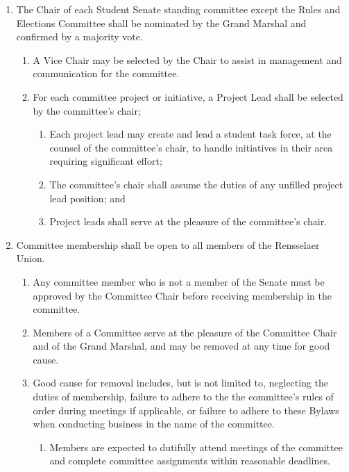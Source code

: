 \begin{enumerate}

    \item The Chair of each Student Senate standing committee except the Rules and Elections Committee shall be nominated by the Grand Marshal and confirmed by a majority vote.
    \begin{enumerate}
        \item A Vice Chair may be selected by the Chair to assist in management and communication for the committee.

        \item For each committee project or initiative, a Project Lead shall be selected by the committee's chair;
        \begin{enumerate}
            \item Each project lead may create and lead a student task force, at the counsel of the committee's chair, to handle initiatives in their area requiring significant effort;

            \item The committee's chair shall assume the duties of any unfilled project lead position; and

            \item Project leads shall serve at the pleasure of the committee's chair.
        \end{enumerate}
    \end{enumerate}

    \item Committee membership shall be open to all members of the Rensselaer Union.
    \begin{enumerate}
        \item Any committee member who is not a member of the Senate must be approved by the Committee Chair before receiving
        membership in the committee.

        \item Members of a Committee serve at the pleasure of the Committee Chair and of the Grand Marshal, and may be removed at
        any time for good cause.

        \item Good cause for removal includes, but is not limited to, neglecting the duties of membership, failure to adhere to the the committee's rules of order during meetings if applicable, or failure to adhere to these Bylaws when conducting business in the name of the committee.
        \begin{enumerate}
            \item Members are expected to dutifully attend meetings of the committee and complete committee assignments within reasonable deadlines.
        \end{enumerate}
    \end{enumerate}


\end{enumerate}
